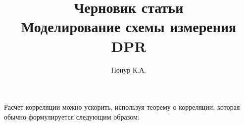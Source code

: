 
\title{Черновик статьи \\ \textbf{Моделирование схемы измерения DPR}}
\author{Понур К.А.}

\maketitle













Расчет корреляции можно ускорить, используя теорему о корреляции, которая
обычно формулируется следующим образом:

